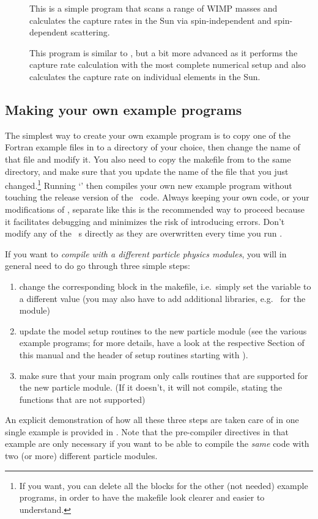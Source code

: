 \begin{description}
\item[] This is a simple program that scans a range of WIMP masses and calculates the capture rates in the Sun via spin-independent and spin-dependent scattering. 
\item[] This program is similar to , but a bit more advanced as it performs the capture rate calculation with the most complete numerical setup and also calculates the capture rate on individual elements in the Sun.
\end{description}



\subsection{Making your own example programs}
\label{sec:makeownmain}
The simplest way to create your own example program is to copy one of the Fortran example files 
in  to a directory of your choice,  then change the name of that file and modify it. 
You also need to copy the makefile from  to the same directory, 
and make sure that you update the name of the file that you just changed.\footnote{%
If you want, you can delete all the blocks for the other (not needed) example programs, in order 
to have the makefile look clearer and easier to understand.
}
Running `' then compiles your own new example program without touching the release
version of the \ds\ code. Always keeping your own code, or your modifications of \ds, separate like this
is the recommended way to proceed because it facilitates debugging and minimizes the risk of 
introducing errors. Don't modify any of the \ds\ s directly as they are overwritten every time you run .

\bigskip
\noindent
If you want to {\it compile with a different particle physics modules}, you will in general need to do go 
through three simple steps:
\begin{enumerate}
\item change the corresponding block in the makefile, i.e.~simply set the variable  
         to a different value (you may also have to add additional libraries, e.g.~ for  the 
         module)
\item update the model setup routines to the new particle module (see the various example 
programs; for more details, have a look at the respective Section of this manual and the header of  setup
routines starting with ).
\item make sure that your main program only calls routines that are supported for the new particle module.
(If it doesn't, it will not compile, stating the functions that are not supported)
\end{enumerate}
An explicit demonstration of how all these three steps are taken care of in one single example is provided in . 
Note that the pre-compiler 
directives in that example are only necessary if you want to be able to compile the {\it same} code 
with two (or more) different particle modules.


